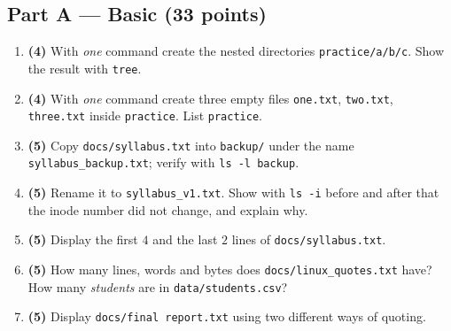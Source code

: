 \documentclass[11pt,a4paper]{article}
\newcommand{\cmd}[1]{\texttt{#1}}
\begin{document}
\subsection*{Part A --- Basic (33 points)}
\begin{enumerate}[leftmargin=2.2em,label=\textbf{\arabic*.}]
  \item \textbf{(4)} With \emph{one} command create the nested directories \texttt{practice/a/b/c}. Show the result with \cmd{tree}.
  \item \textbf{(4)} With \emph{one} command create three empty files \texttt{one.txt}, \texttt{two.txt}, \texttt{three.txt} inside \texttt{practice}. List \texttt{practice}.
  \item \textbf{(5)} Copy \texttt{docs/syllabus.txt} into \texttt{backup/} under the name \texttt{syllabus\_backup.txt}; verify with \cmd{ls -l backup}.
  \item \textbf{(5)} Rename it to \texttt{syllabus\_v1.txt}. Show with \cmd{ls -i} before and after that the inode number did not change, and explain why.
  \item \textbf{(5)} Display the first $4$ and the last $2$ lines of \texttt{docs/syllabus.txt}.
  \item \textbf{(5)} How many lines, words and bytes does \texttt{docs/linux\_quotes.txt} have? How many \emph{students} are in \texttt{data/students.csv}?
  \item \textbf{(5)} Display \texttt{docs/final report.txt} using two different ways of quoting.
\end{enumerate}
\end{document}

